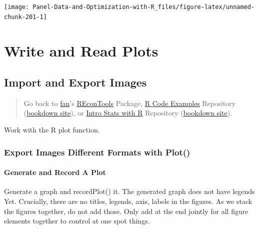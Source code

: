 \documentclass[
]{book}
\begin{document}
\begin{center}\texttt{[image: Panel-Data-and-Optimization-with-R\_files/figure-latex/unnamed-chunk-201-1]} \end{center}

\hypertarget{write-and-read-plots}{%
\section{Write and Read Plots}\label{write-and-read-plots}}

\hypertarget{import-and-export-images}{%
\subsection{Import and Export Images}\label{import-and-export-images}}

\begin{quote}
Go back to \href{http://fanwangecon.github.io/}{fan}'s \href{https://fanwangecon.github.io/REconTools/}{REconTools} Package, \href{https://fanwangecon.github.io/R4Econ/}{R Code Examples} Repository (\href{https://fanwangecon.github.io/R4Econ/bookdown}{bookdown site}), or \href{https://fanwangecon.github.io/Stat4Econ/}{Intro Stats with R} Repository (\href{https://fanwangecon.github.io/Stat4Econ/bookdown}{bookdown site}).
\end{quote}

Work with the R plot function.

\hypertarget{export-images-different-formats-with-plot}{%
\subsubsection{Export Images Different Formats with Plot()}\label{export-images-different-formats-with-plot}}

\hypertarget{generate-and-record-a-plot}{%
\paragraph{Generate and Record A Plot}\label{generate-and-record-a-plot}}

Generate a graph and recordPlot() it. The generated graph does not have legends Yet. Crucially, there are no titles, legends, axis, labels in the figures. As we stack the figures together, do not add those. Only add at the end jointly for all figure elements together to control at one spot things.
\end{document}
